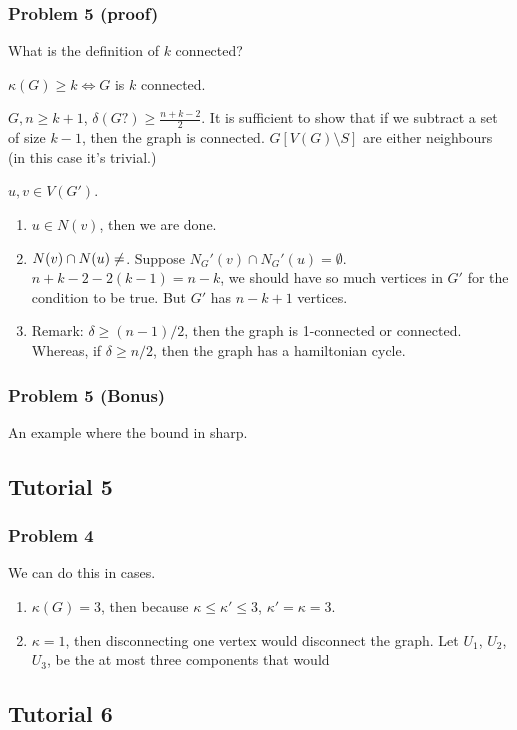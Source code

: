 \documentclass[11pt]{article}
\begin{document}
\subsubsection{Problem 5 (proof)}
\label{sec:org3326f1a}
What is the definition of \(k\) connected? 

\(\kappa(G) \ge k \iff G\) is \(k\) connected.

\(G, n \ge k+1\), \(\delta(G?) \ge \frac{n+k-2}{2}\). It is sufficient to show
that if we subtract a set of size \(k-1\), then the graph is connected.
\(G[V(G)\setminus S]\) are either neighbours (in this case it's trivial.)

\(u, v \in V(G')\). 

\begin{enumerate}
\item \(u \in N(v)\), then we are done.
\item \(N(v) \cap N(u) \neq \empty\). Suppose \(N_G'(v) \cap N_G'(u) = \emptyset\).
\(n+k-2 - 2(k-1) = n-k\), we should have so much vertices in \(G'\) for the
condition to be true. But \(G'\) has \(n-k+1\) vertices.
\item Remark: \(\delta \ge (n-1)/2\), then the graph is 1-connected or connected.
Whereas, if \(\delta \ge n/2\), then the graph has a hamiltonian cycle.
\end{enumerate}
\subsubsection{Problem 5 (Bonus)}
\label{sec:org82372dc}
An example where the bound in sharp.
\subsection{Tutorial 5}
\label{sec:org71ae1fe}
\subsubsection{Problem 4}
\label{sec:orga7f77b0}
We can do this in cases. 

\begin{enumerate}
\item \(\kappa(G) = 3\), then because \(\kappa \le \kappa' \le 3\), \(\kappa' =
       \kappa = 3\).
\item \(\kappa = 1\), then disconnecting one vertex would disconnect the graph.
Let \(U_1\), \(U_2\), \(U_3\), be the at most three components that would
\end{enumerate}
\subsection{Tutorial 6}
\label{sec:org447cc9a}
\end{document}
